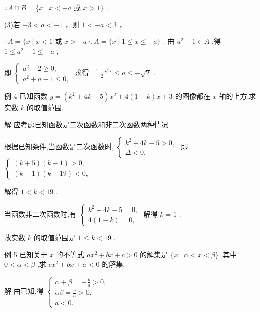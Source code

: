 \documentclass[10pt]{article}
\begin{document}
\(\therefore A \cap  B = \{ x \mid  x <  - a\) 或 \(x > 1\}\) .

(3)若 \(- 3 < a <  - 1\) ，则 \(1 <  - a < 3\) ，

\(\therefore A = \{ x \mid  x < 1\) 或 \(x >  - a\} ,\bar{A} = \{ x \mid  1 \leq  x \leq   - a\}\) . 由 \({a}^{2} - 1 \in  \bar{A}\) ,得 \(1 \leq  {a}^{2} - 1 \leq   - a\) ,

即 \(\left\{  \begin{array}{l} {a}^{2} - 2 \geq  0, \\  {a}^{2} + a - 1 \leq  0, \end{array}\right.\) 求得 \(\frac{-1 - \sqrt{5}}{2} \leq  a \leq   - \sqrt{2}\) .

例 4 已知函数 \(y = \left( {{k}^{2} + {4k} - 5}\right) {x}^{2} + 4\left( {1 - k}\right) x + 3\) 的图像都在 \(x\) 轴的上方,求实数 \(k\) 的取值范围.

解 应考虑已知函数是二次函数和非二次函数两种情况.

根据已知条件,当函数是二次函数时, \(\left\{  \begin{array}{l} {k}^{2} + {4k} - 5 > 0, \\  \Delta  < 0, \end{array}\right.\) 即 \(\left\{  \begin{array}{l} \left( {k + 5}\right) \left( {k - 1}\right)  > 0, \\  \left( {k - 1}\right) \left( {k - {19}}\right)  < 0, \end{array}\right.\)

解得 \(1 < k < {19}\) .

当函数非二次函数时,有 \(\left\{  \begin{array}{l} {k}^{2} + {4k} - 5 = 0, \\  4\left( {1 - k}\right)  = 0, \end{array}\right.\) 解得 \(k = 1\) .

故实数 \(k\) 的取值范围是 \(1 \leq  k < {19}\) .

例 5 已知关于 \(x\) 的不等式 \(a{x}^{2} + {bx} + c > 0\) 的解集是 \(\{ x \mid  \alpha  < x < \beta \}\) ,其中 \(0 < \alpha  < \beta\) ,求 \(c{x}^{2} + {bx} + a < 0\) 的解集.

解 由已知,得 \(\left\{  \begin{array}{l} \alpha  + \beta  =  - \frac{b}{a} > 0, \\  {\alpha \beta } = \frac{c}{a} > 0, \\  a < 0. \end{array}\right.\)
\end{document}
